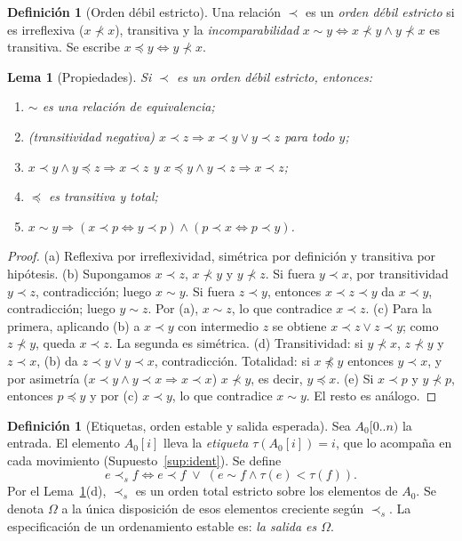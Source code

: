 \documentclass[10pt,a4paper]{article}
\theoremstyle{plain}
\newtheorem{lema}[teorema]{Lema}
\theoremstyle{definition}
\newtheorem{definicion}[teorema]{Definición}
\theoremstyle{remark}
\newcommand{\lt}{\prec}
\newcommand{\nlt}{\not\prec}
\newcommand{\les}{\preccurlyeq}
\newcommand{\eqv}{\sim}
\newcommand{\lts}{\prec_{s}}
\newcommand{\etq}{\tau}
\begin{document}
\begin{definicion}[Orden débil estricto]\label{def:swo}
Una relación $\lt$ es un \emph{orden débil estricto} si es irreflexiva
($x\nlt x$), transitiva y la \emph{incomparabilidad}
$x\eqv y \iff x\nlt y \wedge y\nlt x$ es transitiva. Se escribe
$x\les y \iff y\nlt x$.
\end{definicion}

\begin{lema}[Propiedades]\label{lem:swo}
Si $\lt$ es un orden débil estricto, entonces:
\begin{enumerate}[label=(\alph*),nosep]
\item $\eqv$ es una relación de equivalencia;
\item (transitividad negativa) $x\lt z \Rightarrow x\lt y \vee y\lt z$ para todo $y$;
\item $x\lt y \wedge y\les z \Rightarrow x\lt z$ \quad y \quad $x\les y\wedge y\lt z \Rightarrow x\lt z$;
\item $\les$ es transitiva y total;
\item $x\eqv y \Rightarrow (x\lt p \Leftrightarrow y\lt p)\wedge(p\lt x\Leftrightarrow p\lt y)$.
\end{enumerate}
\end{lema}
\begin{proof}
(a) Reflexiva por irreflexividad, simétrica por definición y transitiva por hipótesis.
(b) Supongamos $x\lt z$, $x\nlt y$ y $y\nlt z$. Si fuera $y\lt x$, por transitividad
$y\lt z$, contradicción; luego $x\eqv y$. Si fuera $z\lt y$, entonces
$x\lt z\lt y$ da $x\lt y$, contradicción; luego $y\eqv z$. Por (a), $x\eqv z$, lo que
contradice $x\lt z$.
(c) Para la primera, aplicando (b) a $x\lt y$ con intermedio $z$ se obtiene
$x\lt z\vee z\lt y$; como $z\nlt y$, queda $x\lt z$. La segunda es simétrica.
(d) Transitividad: si $y\nlt x$, $z\nlt y$ y $z\lt x$, (b) da $z\lt y\vee y\lt x$,
contradicción. Totalidad: si $x\not\les y$ entonces $y\lt x$, y por asimetría
($x\lt y\wedge y\lt x\Rightarrow x\lt x$) $x\nlt y$, es decir, $y\les x$.
(e) Si $x\lt p$ y $y\nlt p$, entonces $p\les y$ y por (c) $x\lt y$, lo que contradice
$x\eqv y$. El resto es análogo.
\end{proof}

\begin{definicion}[Etiquetas, orden estable y salida esperada]\label{def:omega}
Sea $A_0[0..n)$ la entrada. El elemento $A_0[i]$ lleva la \emph{etiqueta}
$\etq(A_0[i]) = i$, que lo acompaña en cada movimiento (Supuesto~\ref{sup:ident}).
Se define
\[
e \lts f \iff e\lt f \;\vee\; (e\eqv f \wedge \etq(e)<\etq(f)).
\]
Por el Lema~\ref{lem:swo}(d), $\lts$ es un orden total estricto sobre los elementos
de $A_0$. Se denota $\Omega$ a la única disposición de esos elementos creciente según
$\lts$. La especificación de un ordenamiento estable es: \emph{la salida es
$\Omega$}.
\end{definicion}
\end{document}
